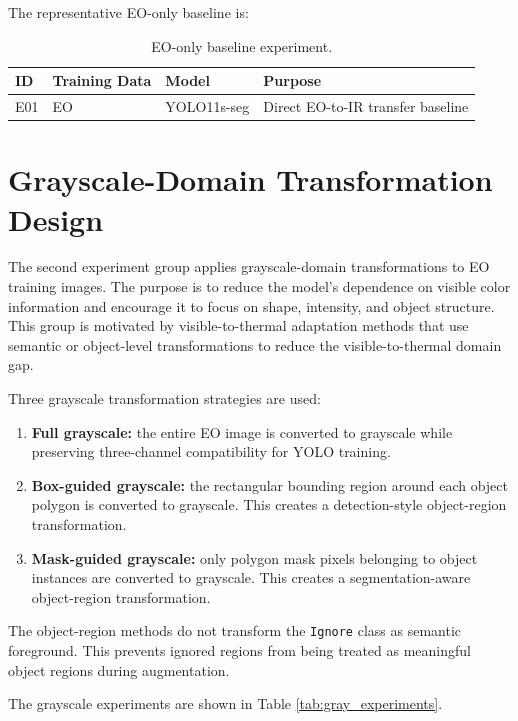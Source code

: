 The representative EO-only baseline is:

\begin{table}[h]
\centering
\caption{EO-only baseline experiment.}
\label{tab:eo_baseline}
\begin{tabular}{llll}
\hline
\textbf{ID} & \textbf{Training Data} & \textbf{Model} & \textbf{Purpose} \\
\hline
E01 & EO & YOLO11s-seg & Direct EO-to-IR transfer baseline \\
\hline
\end{tabular}
\end{table}

\section{Grayscale-Domain Transformation Design}

The second experiment group applies grayscale-domain transformations to EO training images. The purpose is to reduce the model's dependence on visible color information and encourage it to focus on shape, intensity, and object structure. This group is motivated by visible-to-thermal adaptation methods that use semantic or object-level transformations to reduce the visible-to-thermal domain gap.

Three grayscale transformation strategies are used:

\begin{enumerate}
    \item \textbf{Full grayscale:} the entire EO image is converted to grayscale while preserving three-channel compatibility for YOLO training.
    \item \textbf{Box-guided grayscale:} the rectangular bounding region around each object polygon is converted to grayscale. This creates a detection-style object-region transformation.
    \item \textbf{Mask-guided grayscale:} only polygon mask pixels belonging to object instances are converted to grayscale. This creates a segmentation-aware object-region transformation.
\end{enumerate}

The object-region methods do not transform the \texttt{Ignore} class as semantic foreground. This prevents ignored regions from being treated as meaningful object regions during augmentation.

The grayscale experiments are shown in Table \ref{tab:gray_experiments}.

